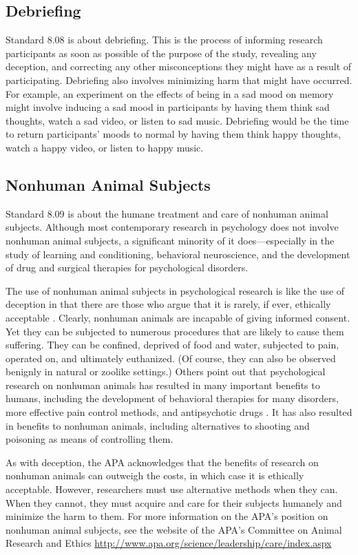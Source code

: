 \subsection{Debriefing}


Standard 8.08 is about debriefing. This is the process of informing research participants as soon as possible of the purpose of the study, revealing any deception, and correcting any other misconceptions they might have as a result of participating. Debriefing also involves minimizing harm that might have occurred. For example, an experiment on the effects of being in a sad mood on memory might involve inducing a sad mood in participants by having them think sad thoughts, watch a sad video, or listen to sad music. Debriefing would be the time to return participants' moods to normal by having them think happy thoughts, watch a happy video, or listen to happy music.


\subsection{Nonhuman Animal Subjects}


Standard 8.09 is about the humane treatment and care of nonhuman animal subjects. Although most contemporary research in psychology does not involve nonhuman animal subjects, a significant minority of it does---especially in the study of learning and conditioning, behavioral neuroscience, and the development of drug and surgical therapies for psychological disorders.


The use of nonhuman animal subjects in psychological research is like the use of deception in that there are those who argue that it is rarely, if ever, ethically acceptable \citep{bowd_case_1993}. Clearly, nonhuman animals are incapable of giving informed consent. Yet they can be subjected to numerous procedures that are likely to cause them suffering. They can be confined, deprived of food and water, subjected to pain, operated on, and ultimately euthanized. (Of course, they can also be observed benignly in natural or zoolike settings.) Others point out that psychological research on nonhuman animals has resulted in many important benefits to humans, including the development of behavioral therapies for many disorders, more effective pain control methods, and antipsychotic drugs \citep{miller_value_1985}. It has also resulted in benefits to nonhuman animals, including alternatives to shooting and poisoning as means of controlling them.


As with deception, the APA acknowledges that the benefits of research on nonhuman animals can outweigh the costs, in which case it is ethically acceptable. However, researchers must use alternative methods when they can. When they cannot, they must acquire and care for their subjects humanely and minimize the harm to them. For more information on the APA's position on nonhuman animal subjects, see the website of the APA's Committee on Animal Research and Ethics \url{http://www.apa.org/science/leadership/care/index.aspx}


